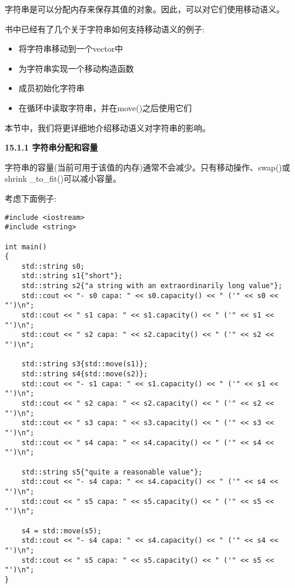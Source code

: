 字符串是可以分配内存来保存其值的对象。因此，可以对它们使用移动语义。\par

书中已经有了几个关于字符串如何支持移动语义的例子:\par

\begin{itemize}
	\item 将字符串移动到一个vector中
	\item 为字符串实现一个移动构造函数
	\item 成员初始化字符串
	\item 在循环中读取字符串，并在move()之后使用它们
\end{itemize}

本节中，我们将更详细地介绍移动语义对字符串的影响。\par

\hspace*{\fill} \par %
\textbf{15.1.1 字符串分配和容量}

字符串的容量(当前可用于该值的内存)通常不会减少。只有移动操作、swap()或shrink \_to\_fit()可以减小容量。\par

考虑下面例子:\par

{\color{red}{lib/stringmoveassign.cpp}}\par

\begin{lstlisting}[caption={}]
#include <iostream>
#include <string>

int main()
{
	std::string s0;
	std::string s1{"short"};
	std::string s2{"a string with an extraordinarily long value"};
	std::cout << "- s0 capa: " << s0.capacity() << " ('" << s0 << "')\n";
	std::cout << " s1 capa: " << s1.capacity() << " ('" << s1 << "')\n";
	std::cout << " s2 capa: " << s2.capacity() << " ('" << s2 << "')\n";
	
	std::string s3{std::move(s1)};
	std::string s4{std::move(s2)};
	std::cout << "- s1 capa: " << s1.capacity() << " ('" << s1 << "')\n";
	std::cout << " s2 capa: " << s2.capacity() << " ('" << s2 << "')\n";
	std::cout << " s3 capa: " << s3.capacity() << " ('" << s3 << "')\n";
	std::cout << " s4 capa: " << s4.capacity() << " ('" << s4 << "')\n";
	
	std::string s5{"quite a reasonable value"};
	std::cout << "- s4 capa: " << s4.capacity() << " ('" << s4 << "')\n";
	std::cout << " s5 capa: " << s5.capacity() << " ('" << s5 << "')\n";
	
	s4 = std::move(s5);
	std::cout << "- s4 capa: " << s4.capacity() << " ('" << s4 << "')\n";
	std::cout << " s5 capa: " << s5.capacity() << " ('" << s5 << "')\n";
}
\end{lstlisting}

